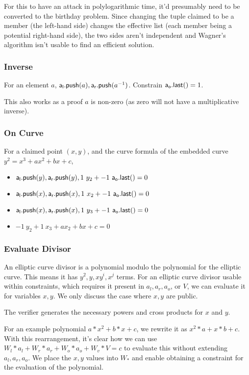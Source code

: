\documentclass[]{article}
\begin{document}
For this to have an attack in polylogarithmic time, it'd presumably need to be converted to the birthday problem. Since changing the tuple claimed to be a member (the left-hand side) changes the effective list (each member being a potential right-hand side), the two sides aren't independent and Wagner's algorithm isn't usable to find an efficient solution.

\subsubsection{Inverse}

For an element $a$, $\mathsf{a_l.push}(a), \mathsf{a_r.push}(a^{-1})$. Constrain $\mathsf{a_o.last()} = 1$.

This also works as a proof $a$ is non-zero (as zero will not have a multiplicative inverse).

\subsubsection{On Curve}

For a claimed point $(x, y)$, and the curve formula of the embedded curve $y^2 = x^3 + a x^2 + b x + c$,

\begin{itemize}
	\item $\mathsf{a_l.push}(y), \mathsf{a_r.push}(y), 1 ~y_2 + -1 ~\mathsf{a_o.last()} = 0$
	\item $\mathsf{a_l.push}(x), \mathsf{a_r.push}(x), 1 ~x_2 + -1 ~\mathsf{a_o.last()} = 0$
	\item $\mathsf{a_l.push}(x), \mathsf{a_r.push}(x), 1 ~y_3 + -1 ~\mathsf{a_o.last()} = 0$
	\item $-1 ~y_2 + 1 ~x_3 + a x_2 + b x + c = 0$
\end{itemize}

\subsubsection{Evaluate Divisor}

An elliptic curve divisor is a polynomial modulo the polynomial for the elliptic curve. This means it has $y^2, y, xy^i, x^j$ terms. For an elliptic curve divisor usable within constraints, which requires it present in $a_l, a_r, a_o$, or $V$, we can evaluate it for variables $x, y$. We only discuss the case where $x, y$ are public.

The verifier generates the necessary powers and cross products for $x$ and $y$.

For an example polynomial $a * x^2 + b * x + c$, we rewrite it as $x^2 * a + x * b + c$. With this rearrangement, it's clear how we can use $W_l * a_l + W_r * a_r + W_o * a_o + W_v * V = c$ to evaluate this without extending $a_l, a_r, a_o$. We place the $x, y$ values into $W_*$ and enable obtaining a constraint for the evaluation of the polynomial.
\end{document}
